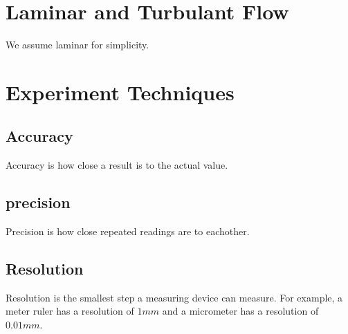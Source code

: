 \documentclass{article}
\begin{document}
\section{Laminar and Turbulant Flow}
\begin{center}
\end{center}

\begin{center}
\end{center}
We assume laminar for simplicity.

\section{Experiment Techniques}

\subsection{Accuracy}
Accuracy is how close a result is to the actual value.

\subsection{precision}
Precision is how close repeated readings are to eachother.

\subsection{Resolution}
Resolution is the smallest step a measuring device can measure.
For example, a meter ruler has a resolution of $1\si{mm}$ and a micrometer has
a resolution of $0.01\si{mm}$.
\end{document}
